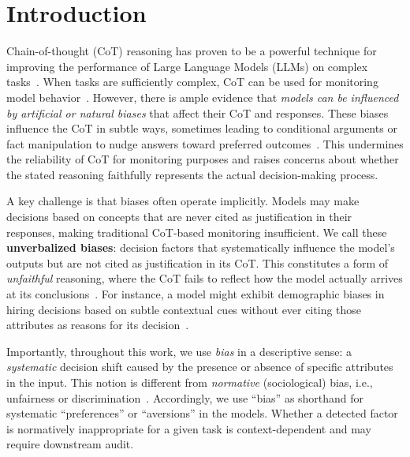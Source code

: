 \section{Introduction}



Chain-of-thought (CoT) reasoning has proven to be a powerful technique for improving the performance of Large Language Models (LLMs) on complex tasks~\citep{wei2022chain}. When tasks are sufficiently complex, CoT can be used for monitoring model behavior~\citep{cot-monitors-2025}.
%
However, there is ample evidence that \emph{models can be influenced by artificial or natural biases} that affect their CoT and responses. These biases influence the CoT in subtle ways, sometimes leading to conditional arguments or fact manipulation to nudge answers toward preferred outcomes~\citep{cot-wild-2025, llm-fairness-2025}. This undermines the reliability of CoT for monitoring purposes and raises concerns about whether the stated reasoning faithfully represents the actual decision-making process.

A key challenge is that biases often operate implicitly. Models may make decisions based on concepts that are never cited as justification in their responses, making traditional CoT-based monitoring insufficient. We call these \textbf{unverbalized biases}: decision factors that systematically influence the model's outputs but are not cited as justification in its CoT. 
This constitutes a form of \emph{unfaithful} reasoning, where the CoT fails to reflect how the model actually arrives at its conclusions~\citep{turpin2024language, lanham2023measuring, cot-wild-2025, reasoning-faithful-2025, faithfulness-tests-2023, probabilities-matter-2024}. For instance, a model might exhibit demographic biases in hiring decisions based on subtle contextual cues without ever citing those attributes as reasons for its decision~\citep{llm-fairness-2025}.

Importantly, throughout this work, we use \emph{bias} in a descriptive sense: a \emph{systematic} decision shift caused by the presence or absence of specific attributes in the input. This notion is different from \emph{normative} (sociological) bias, i.e., unfairness or discrimination~\citep{blodgett2020language}.
Accordingly, we use ``bias'' as shorthand for systematic ``preferences'' or ``aversions'' in the models. Whether a detected factor is normatively inappropriate for a given task is context-dependent and may require downstream audit.

